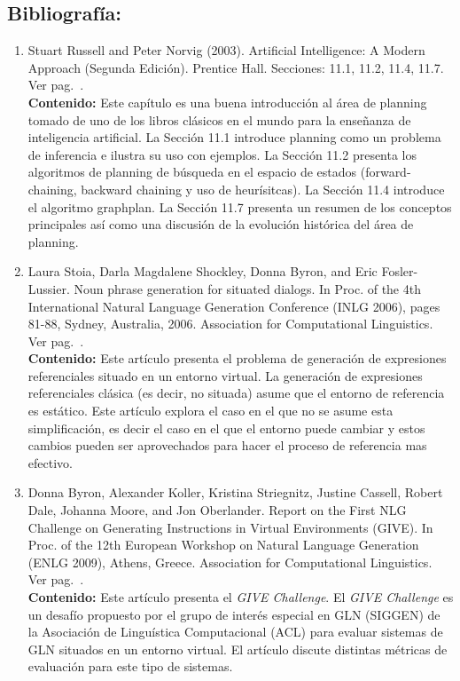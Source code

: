 \documentclass[a4paper]{article}
\begin{document}
\subsection*{Bibliograf\'ia:}
\begin{enumerate}
\item Stuart Russell and Peter Norvig (2003). Artificial Intelligence: A Modern Approach (Segunda Edici\'on). Prentice Hall. Secciones: 11.1, 11.2, 11.4, 11.7. Ver pag.~\pageref{planning-state-search}. \\
\textbf{Contenido:} Este cap\'itulo es una buena introducci\'on al \'area de planning tomado de uno de los libros cl\'asicos en el mundo para la ense\~nanza de inteligencia artificial. La Secci\'on 11.1 introduce planning como un problema de inferencia e ilustra su uso con ejemplos. La Secci\'on 11.2 presenta los algoritmos de planning de b\'usqueda en el espacio de estados (forward-chaining, backward chaining y uso de heur\'isitcas). La Secci\'on 11.4 introduce el algoritmo graphplan. La Secci\'on 11.7 presenta un resumen de los conceptos principales as\'i como una discusi\'on de la evoluci\'on hist\'orica del \'area de planning.  
\item Laura Stoia, Darla Magdalene Shockley, Donna Byron, and Eric Fosler-Lussier. Noun phrase generation for situated dialogs. In Proc. of the 4th International Natural Language Generation Conference (INLG 2006), pages 81-88, Sydney, Australia, 2006. Association for Computational Linguistics. Ver pag.~\pageref{give-challenge}.\\
\textbf{Contenido:} Este art\'iculo presenta el problema de generaci\'on de expresiones referenciales situado en un entorno virtual. La generaci\'on de expresiones referenciales cl\'asica (es decir, no situada) asume que el entorno de referencia es est\'atico. Este art\'iculo explora el caso en el que no se asume esta simplificaci\'on, es decir el caso en el que el entorno puede cambiar y estos cambios pueden ser aprovechados para hacer el proceso de referencia mas efectivo. 
\item Donna Byron, Alexander Koller, Kristina Striegnitz, Justine Cassell, Robert Dale, Johanna Moore, and Jon Oberlander. Report on the First NLG Challenge on Generating Instructions in Virtual Environments (GIVE). In Proc. of the 12th European Workshop on Natural Language Generation (ENLG 2009), Athens, Greece. Association for Computational Linguistics. Ver pag.~\pageref{situated-REG}. \\
\textbf{Contenido:} Este art\'iculo presenta el \textit{GIVE Challenge}. El \textit{GIVE Challenge} es un desaf\'io propuesto por el grupo de inter\'es especial en GLN (SIGGEN) de la Asociaci\'on de Lingu\'istica Computacional (ACL) para evaluar sistemas de GLN situados en un entorno virtual. El art\'iculo discute distintas m\'etricas de evaluaci\'on para este tipo de sistemas. 
\end{enumerate}
\end{document}
